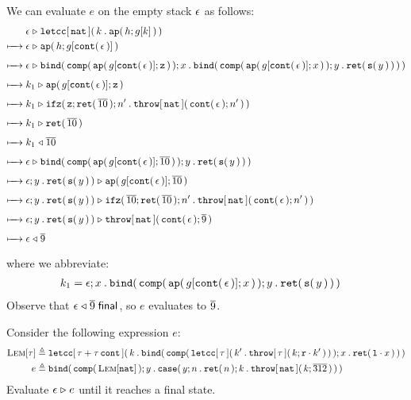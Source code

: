 \documentclass[11pt]{article}
\begin{document}
We can evaluate $e$ on the empty stack $\EmptyStack$ as follows:
\begin{align*}
             & \CEval{\EmptyStack}{\letccabt{\nattycst}{k}{\appabt{h}{g[k]}}} \\
  \StepsTo{} & \CEval{\EmptyStack}{\appabt{h}{g[\contexabt{\EmptyStack}]}} \\
  \StepsTo{} & \CEval{\EmptyStack}{\bindabt{\compabt{\appabt{g[\contexabt{\EmptyStack}]}{\zeroabt}}}{x}{\bindabt{\compabt{\appabt{g[\contexabt{\EmptyStack}]}{x}}}{y}{\retabt{\succabt{y}}}}} \\
  \StepsTo{} & \CEval{k_1}{\appabt{g[\contexabt{\EmptyStack}]}{\zeroabt}} \\
  \StepsTo{} & \CEval{k_1}{\ifzabt{\zeroabt}{\retabt{\numeral{10}}}{n'}{\throwabt{\nattycst}{\contexabt{\EmptyStack}}{n'}}} \\
  \StepsTo{} & \CEval{k_1}{\retabt{\numeral{10}}} \\
  \StepsTo{} & \CRet{k_1}{\numeral{10}} \\
  \StepsTo{} & \CEval{\EmptyStack}{\bindabt{\compabt{\appabt{g[\contexabt{\EmptyStack}]}{\numeral{10}}}}{y}{\retabt{\succabt{y}}}} \\
  \StepsTo{} & \CEval{\StackFrame{\EmptyStack}{y}{\retabt{\succabt{y}}}}{\appabt{g[\contexabt{\EmptyStack}]}{\numeral{10}}} \\
  \StepsTo{} & \CEval{\StackFrame{\EmptyStack}{y}{\retabt{\succabt{y}}}}{\ifzabt{\numeral{10}}{\retabt{\numeral{10}}}{n'}{\throwabt{\nattycst}{\contexabt{\EmptyStack}}{n'}}} \\
  \StepsTo{} & \CEval{\StackFrame{\EmptyStack}{y}{\retabt{\succabt{y}}}}{\throwabt{\nattycst}{\contexabt{\EmptyStack}}{\numeral{9}}} \\
  \StepsTo{} & \CRet{\EmptyStack}{\numeral{9}}
\end{align*}
where we abbreviate:
\begin{align*}
  k_1 &= \StackFrame{\EmptyStack}{x}{\bindabt{\compabt{\appabt{g[\contexabt{\EmptyStack}]}{x}}}{y}{\retabt{\succabt{y}}}}
\end{align*}
Observe that $\IsFinal{\CRet{\EmptyStack}{\numeral{9}}}$, so $e$ evaluates to $\numeral{9}$.

Consider the following expression $e$:
\begin{align*}
  \textsc{Lem}[\tau] &\isdef{} \letccabt{\sumtycst{\tau}{\conttycst{\tau}}}{k}{\bindabt{\compabt{\letccabt{\tau}{k'}{\throwabt{\tau}{k}{\inrexcst{}{k'}}}}}{x}{\retabt{\inlexcst{}{x}}}} \\
  e &\isdef{} \bindabt{\compabt{\textsc{Lem}[\nattycst]}}{y}{\caseexabt{y}{n}{}{\retabt{n}}{k}{}{\throwabt{\nattyabt}{k}{\numeral{312}}}}
\end{align*}
Evaluate $\CEval{\EmptyStack}{e}$ until it reaches a final state.
\end{document}
